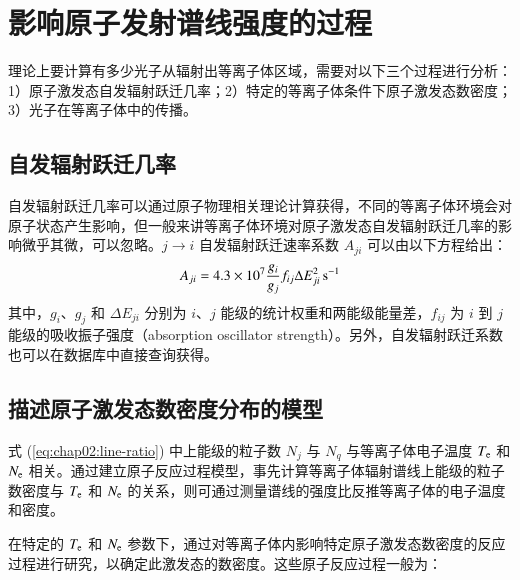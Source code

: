 \section{影响原子发射谱线强度的过程}

理论上要计算有多少光子从辐射出等离子体区域，需要对以下三个过程进行分析：1）原子激发态自发辐射跃迁几率；2）特定的等离子体条件下原子激发态数密度；3）光子在等离子体中的传播。

\subsection{自发辐射跃迁几率}
\label{sec:chap02:Aji}

自发辐射跃迁几率可以通过原子物理相关理论计算获得，不同的等离子体环境会对原子状态产生影响，但一般来讲等离子体环境对原子激发态自发辐射跃迁几率的影响微乎其微，可以忽略。$j\to i$ 自发辐射跃迁速率系数 $A_{ji}$ 可以由以下方程给出\cite{Kolb1964:A-formular}：
\begin{equation}
  A_{ji}=4.3\times10^7\frac{g_i}{g_j}f_{ij}\Delta E_{ji}^2\,{\rm s}^{-1}
\end{equation}
其中，$g_i$、$g_j$ 和 $\Delta E_{ji}$ 分别为 $i$、$j$ 能级的统计权重和两能级能量差，$f_{ij}$ 为 $i$ 到 $j$ 能级的吸收振子强度（absorption oscillator strength）\cite{Johnson1972:collisionalstrength}。另外，自发辐射跃迁系数也可以在数据库\cite{NISTdatabase}中直接查询获得。

\subsection{描述原子激发态数密度分布的模型}

式 (\ref{eq:chap02:line-ratio}) 中上能级的粒子数 $N_j$ 与 $N_q$ 与等离子体电子温度 $T_{\rm e}$ 和 $N_{\rm e}$ 相关。通过建立原子反应过程模型，事先计算等离子体辐射谱线上能级的粒子数密度与 $T_{\rm e}$ 和 $N_{\rm e}$ 的关系，则可通过测量谱线的强度比反推等离子体的电子温度和密度。

在特定的 $T_{\rm e}$ 和 $N_{\rm e}$ 参数下，通过对等离子体内影响特定原子激发态数密度的反应过程进行研究，以确定此激发态的数密度。这些原子反应过程一般为\cite{atomicprocesses,YuChangxuan:book}：


